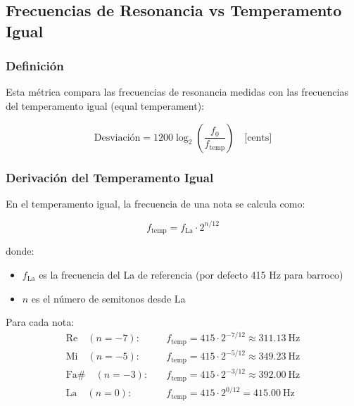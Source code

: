 \documentclass[12pt,a4paper,twocolumn]{article}
\newcommand{\freq}{f}
\newcommand{\freqzero}{f_0}
\begin{document}
\subsection{Frecuencias de Resonancia vs Temperamento Igual}

\subsubsection{Definición}

Esta métrica compara las frecuencias de resonancia medidas con las frecuencias del temperamento igual (equal temperament):

\begin{equation}
\text{Desviación} = 1200 \log_2\left(\frac{\freqzero}{\freq_{\text{temp}}}\right) \quad \text{[cents]}
\label{eq:deviation_temperament}
\end{equation}

\subsubsection{Derivación del Temperamento Igual}

En el temperamento igual, la frecuencia de una nota se calcula como:

\begin{equation}
\freq_{\text{temp}} = \freq_{\text{La}} \cdot 2^{n/12}
\label{eq:temperamento_igual}
\end{equation}

donde:
\begin{itemize}
    \item $\freq_{\text{La}}$ es la frecuencia del La de referencia (por defecto 415 Hz para barroco)
    \item $n$ es el número de semitonos desde La
\end{itemize}

Para cada nota:
\begin{align}
\text{Re} \quad (n = -7): \quad &\freq_{\text{temp}} = 415 \cdot 2^{-7/12} \approx \SI{311.13}{\hertz} \\
\text{Mi} \quad (n = -5): \quad &\freq_{\text{temp}} = 415 \cdot 2^{-5/12} \approx \SI{349.23}{\hertz} \\
\text{Fa\#} \quad (n = -3): \quad &\freq_{\text{temp}} = 415 \cdot 2^{-3/12} \approx \SI{392.00}{\hertz} \\
\text{La} \quad (n = 0): \quad &\freq_{\text{temp}} = 415 \cdot 2^{0/12} = \SI{415.00}{\hertz}
\label{eq:frecuencias_notas}
\end{align}
\end{document}
